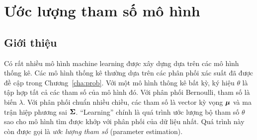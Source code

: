 \chapter{Ước lượng tham số mô hình}




\section{Giới thiệu}







Có rất nhiều mô hình machine learning được xây dựng dựa trên các mô hình thống
kê. Các mô hình thống kê thường dựa trên các phân phối xác suất đã được đề cập
trong Chương~\ref{cha:prob}. Với một mô hình thông kê bất kỳ, ký hiệu $\theta$
là tập hợp tất cả các tham số của mô hình đó. Với phân phối Bernoulli, tham số
là biến $\lambda$. Với phân phối chuẩn nhiều chiều, các tham số là vector kỳ
vọng $\boldsymbol{\mu}$ và ma trận hiệp phương sai $\mathbf{\Sigma}$.  ``Learning'' chính là quá
trình {ước lượng} bộ tham số $\theta$ sao cho mô hình tìm được khớp với phân
phối của dữ liệu nhất. Quá trình này còn được gọi là \textit{ước lượng tham số} (parameter estimation).

